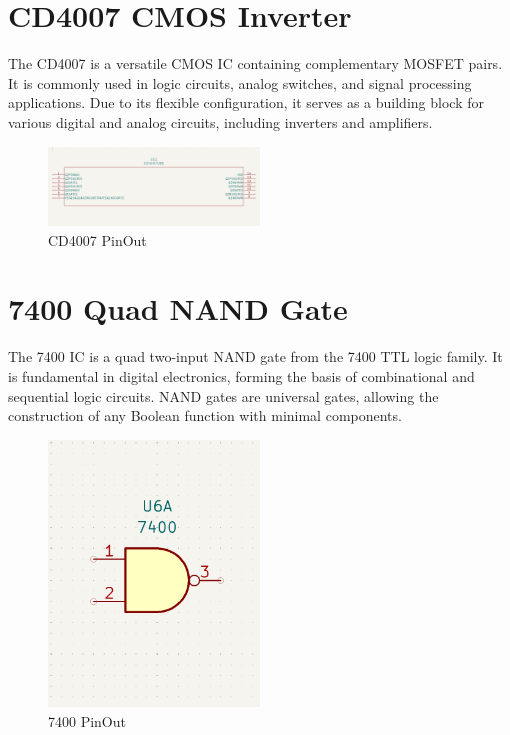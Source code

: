 \documentclass{article}
\begin{document}
\section{CD4007 CMOS Inverter}
The CD4007 is a versatile CMOS IC containing complementary MOSFET pairs. It is commonly used in logic circuits, analog switches, and signal processing applications. Due to its flexible configuration, it serves as a building block for various digital and analog circuits, including inverters and amplifiers.
\begin{figure}[H]
    \centering
    \includegraphics[width=0.5\textwidth]{img/CD4007.png}
    \caption{CD4007 PinOut}
    \label{fig:CD4007}
\end{figure}

\section{7400 Quad NAND Gate}
The 7400 IC is a quad two-input NAND gate from the 7400 TTL logic family. It is fundamental in digital electronics, forming the basis of combinational and sequential logic circuits. NAND gates are universal gates, allowing the construction of any Boolean function with minimal components.
\begin{figure}[H]
    \centering
    \includegraphics[width=0.5\textwidth]{img/7400.png}
    \caption{7400 PinOut}
    \label{fig:7400}
\end{figure}
\end{document}
